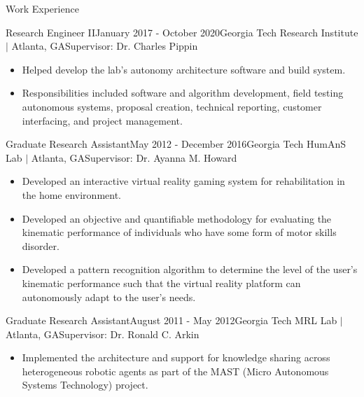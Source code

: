 \documentclass{resume} %
\begin{document}
\begin{rSection}{Work Experience}
\begin{rSubsection}{Research Engineer II}{January 2017 - October 2020}{Georgia Tech Research Institute $\vert$ Atlanta, GA}{Supervisor: Dr. Charles Pippin}
\begin{itemize}
\item Helped develop the lab’s autonomy architecture software and build system.

\item Responsibilities included software and algorithm development, field
  testing autonomous systems, proposal creation, technical reporting, customer
  interfacing, and project management.

\end{itemize}

\end{rSubsection}


\begin{rSubsection}{Graduate Research Assistant}{May 2012 - December 2016}{Georgia Tech HumAnS Lab $\vert$ Atlanta, GA}{Supervisor: Dr. Ayanna M. Howard}

\item
\begin{itemize}
\item Developed an interactive virtual reality gaming system for rehabilitation
  in the home environment.

\item Developed an objective and quantifiable methodology for evaluating the
  kinematic performance of individuals who have some form of motor skills
  disorder.

\item Developed a pattern recognition algorithm to determine the level of the
  user's kinematic performance such that the virtual reality platform can
  autonomously adapt to the user's needs.

\end{itemize}

\end{rSubsection}


\iffalse
\begin{rSubsection}{Graduate Research Assistant}{August 2011 - May 2012}{Georgia Tech MRL Lab $\vert$ Atlanta, GA}{Supervisor: Dr. Ronald C. Arkin}

\item
\begin{itemize}

\item Implemented the architecture and support for knowledge sharing across
  heterogeneous robotic agents as part of the MAST (Micro Autonomous Systems
  Technology) project.


\end{itemize}
\end{rSubsection}
\end{rSection}
\end{document}
